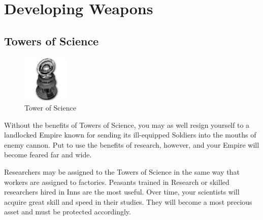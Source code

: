 
\chapter{Developing Weapons}

\section{Towers of Science}

\begin{figure}
	\vspace{-20pt}
	\begin{center}
		\includegraphics[width=0.2\textwidth]{Itower}
		\\ Tower of Science
	\end{center}
	\vspace{-20pt}
\end{figure}

Without the benefits of Towers of Science, you may as well resign yourself to a landlocked Empire known for sending its ill-equipped Soldiers into the mouths of enemy cannon. Put to use the benefits of research, however, and your Empire will become feared far and wide.

Researchers may be assigned to the Towers of Science in the same way that workers are assigned to factories. Peasants trained in Research or skilled researchers hired in Inns are the most useful. Over time, your scientists will acquire great skill and speed in their studies. They will become a most precious asset and must be protected accordingly.

